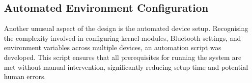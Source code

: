 \subsection{Automated Environment Configuration}

Another unusual aspect of the design is the automated device setup. Recognising the complexity involved in configuring kernel modules, Bluetooth settings, and environment variables across multiple devices, an automation script was developed. This script ensures that all prerequisites for running the system are met without manual intervention, significantly reducing setup time and potential human errors.





